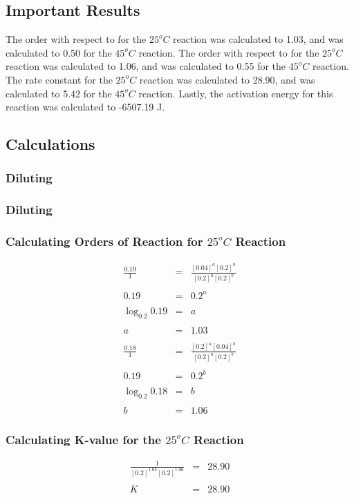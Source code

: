 \documentclass{article}
\begin{document}
\subsection*{Important Results}%
The order with respect to  for the $25^o C$ reaction was calculated to 1.03, and was calculated to 0.50 for the $45^o C$ reaction. The order with respect to  for the $25^o C$ reaction was calculated to 1.06, and was calculated to 0.55 for the $45^o C$ reaction. The rate constant for the $25^o C$ reaction was calculated to 28.90, and was calculated to 5.42 for the $45^o C$ reaction. Lastly, the activation energy for this reaction was calculated to -6507.19 J. 
\subsection*{Calculations}%
\subsubsection*{Diluting }
\subsubsection*{Diluting }
\subsubsection*{Calculating Orders of Reaction for $25^o C$ Reaction} %
\begin{eqnarray*}
	\frac{0.19}{1} &=& \frac{[0.04]^{a}[0.2]^{b}}{[0.2]^{a}[0.2]^{b}} \\\\
	0.19 &=& 0.2^{a}\\\\
	\log_{0.2} 0.19 &=& a \\\\
	a &=& 1.03 \\\\
	\frac{0.18}{1} &=& \frac{[0.2]^{a}[0.04]^{b}}{[0.2]^{a}[0.2]^{b}} \\\\
	0.19 &=& 0.2^{b} \\\\
	\log_{0.2} 0.18 &=& b \\\\
	b &=& 1.06 
\end{eqnarray*}
\subsubsection*{Calculating K-value for the $25^o C$ Reaction}
\begin{eqnarray*}
	\frac{1}{[0.2]^{1.03}[0.2]^{1.06}} &=& 28.90 \\\\
	K &=& 28.90 
\end{eqnarray*}
\end{document}
